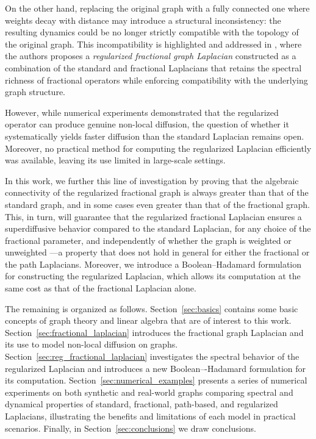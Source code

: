 \documentclass[a4paper,12pt]{article}
\begin{document}
On the other hand, replacing the original graph with a fully connected one where weights decay with distance may introduce a structural inconsistency: the resulting dynamics could be 
no longer strictly compatible with the topology of the original graph. This incompatibility is highlighted and addressed in \cite{Bianchi2022}, where the authors proposes a \emph{regularized fractional graph Laplacian} constructed as a combination of the standard and fractional Laplacians that retains the spectral richness of fractional operators while enforcing compatibility with the underlying graph structure.

However, while numerical experiments demonstrated that the regularized operator can produce genuine non-local diffusion, the question of whether it systematically yields faster diffusion than the standard Laplacian remains open. Moreover, no practical method for computing the regularized Laplacian efficiently was available, leaving its use limited in large-scale settings.

In this work, we further this line of investigation by proving that the algebraic connectivity of the regularized fractional graph is always greater than that of the standard graph, and in some cases even greater than that of the fractional graph. This, in turn, will guarantee that the regularized fractional Laplacian ensures a superdiffusive behavior compared to the standard Laplacian, for any choice of the fractional parameter, and independently of whether the graph is weighted or unweighted —a property that does not hold in general for either the fractional or the path Laplacians. 
Moreover, we introduce a Boolean--Hadamard formulation for constructing the regularized Laplacian, which allows its computation at the same cost as that of the fractional Laplacian alone. 

The remaining is organized as follows. Section~\ref{sec:basics} contains some basic concepts of graph theory and linear algebra that are of interest to this work. Section~\ref{sec:fractional_laplacian} introduces the fractional graph Laplacian and its use to model non-local diffusion on graphs. Section~\ref{sec:reg_fractional_laplacian} investigates the spectral behavior of the regularized Laplacian and introduces a new Boolean–-Hadamard formulation for its computation. Section~\ref{sec:numerical_examples} presents a series of numerical experiments on both synthetic and real-world graphs comparing spectral and dynamical properties of standard, fractional, path-based,
and regularized Laplacians, illustrating the benefits and limitations of each model in practical scenarios. Finally, in Section~\ref{sec:conclusions} we draw conclusions.
\newline
\end{document}
